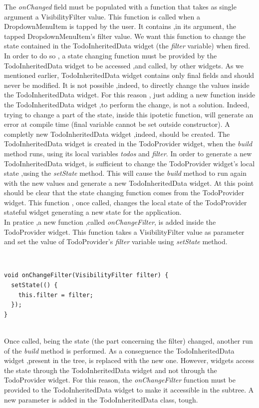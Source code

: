 The \textit{onChanged  }field must be populated with a function that takes as single argument a VisibilityFilter value. This function is called when a DropdownMenuItem is tapped by the user. It contains ,in its argument, the tapped DropdownMenuItem's filter value.  We want this function to change the state contained in the TodoInheritedData widget (the \textit{filter} variable) when fired. In order to do so , a state changing function must be provided by the TodoInheritedData widget to be accessed ,and called, by other widgets. As we mentioned earlier, TodoInheritedData widget contains only final fields and should never be modified. It is not possible ,indeed, to directly change the values inside the TodoInheritedData widget. For this reason , just adding a new function inside the TodoInheritedData widget ,to perform the change, is not a solution. Indeed, trying to change a part of the state, inside this ipotetic function, will generate an error at compile time (final variable cannot be set outside constructor). A completly new TodoInheritedData widget ,indeed, should be created. The TodoInheritedData widget is created in the TodoProvider widget, when the \textit{build} method runs, using its local variables \textit{todos }and \textit{filter}. In order to generate a new TodoInheritedData widget, is sufficient to change the TodoProvider widget's local state ,using the \textit{setState} method. This will cause the \textit{build} method to run again with the new values and generate a new TodoInheritedData widget. At this point should be clear that the state changing function comes from the TodoProvider widget. This function , once called, changes the local state of the TodoProvider stateful widget generating a new state for the application.\\
In pratice ,a new function ,called \textit{onChangeFilter}, is added inside the TodoProvider widget. This function takes a VisibilityFilter value as parameter and set the  value of TodoProvider's \textit{filter} variable using \textit{setState} method. 

\mbox{}\\

\begin{code}
 \mbox{}

\begin{verbatim}
void onChangeFilter(VisibilityFilter filter) {
  setState(() {
    this.filter = filter;
  });
}
\end{verbatim}
\end{code}
\mbox{}\\
Once called, being the state (the part concerning the filter) changed, another run of the \textit{build} method is performed. As a conseguence the TodoInheritedData widget ,present in the tree, is replaced with the new one.
However, widgets access the state through the TodoInheritedData widget and not through the TodoProvider widget. For this reason,
the \textit{onChangeFilter   }function must be provided to the TodoInheritedData widget to make it accessible in the subtree. A new parameter is added in the TodoInheritedData class, tough.

